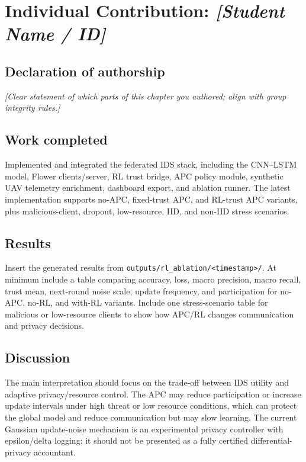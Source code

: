 \documentclass[11pt,a4paper,oneside]{report}
\begin{document}
\chapter{Individual Contribution: \textit{[Student Name / ID]}}
\label{ch:individual-template}

\section*{Declaration of authorship}
\textit{[Clear statement of which parts of this chapter you authored; align with group integrity rules.]}

\section{Work completed}
Implemented and integrated the federated IDS stack, including the CNN--LSTM
model, Flower clients/server, RL trust bridge, APC policy module, synthetic UAV
telemetry enrichment, dashboard export, and ablation runner. The latest
implementation supports no-APC, fixed-trust APC, and RL-trust APC variants, plus
malicious-client, dropout, low-resource, IID, and non-IID stress scenarios.

\section{Results}
Insert the generated results from \texttt{outputs/rl\_ablation/<timestamp>/}.
At minimum include a table comparing accuracy, loss, macro precision, macro
recall, trust mean, next-round noise scale, update frequency, and participation
for no-APC, no-RL, and with-RL variants. Include one stress-scenario table for
malicious or low-resource clients to show how APC/RL changes communication and
privacy decisions.

\section{Discussion}
The main interpretation should focus on the trade-off between IDS utility and
adaptive privacy/resource control. The APC may reduce participation or increase
update intervals under high threat or low resource conditions, which can protect
the global model and reduce communication but may slow learning. The current
Gaussian update-noise mechanism is an experimental privacy controller with
epsilon/delta logging; it should not be presented as a fully certified
differential-privacy accountant.
\end{document}
